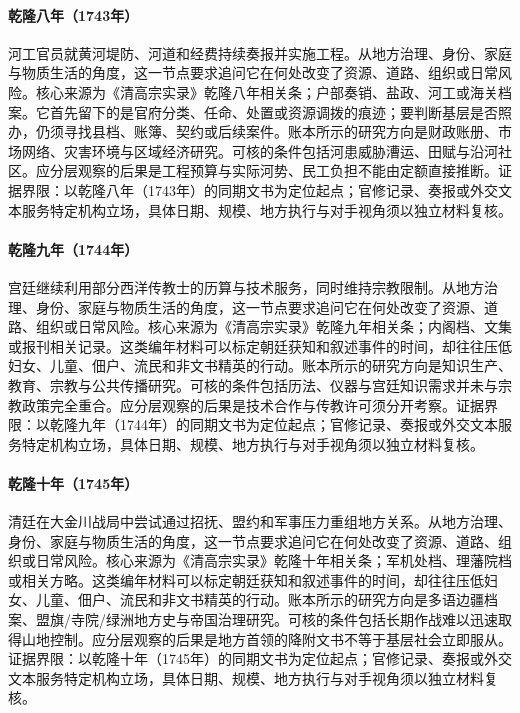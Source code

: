 \hypertarget{social:EQ-1743-YELLOW-RIVER-WORKS}{}\paragraph{乾隆八年（1743年）}河工官员就黄河堤防、河道和经费持续奏报并实施工程。从地方治理、身份、家庭与物质生活的角度，这一节点要求追问它在何处改变了资源、道路、组织或日常风险。核心来源为《清高宗实录》乾隆八年相关条；户部奏销、盐政、河工或海关档案。它首先留下的是官府分类、任命、处置或资源调拨的痕迹；要判断基层是否照办，仍须寻找县档、账簿、契约或后续案件。账本所示的研究方向是财政账册、市场网络、灾害环境与区域经济研究。可核的条件包括河患威胁漕运、田赋与沿河社区。应分层观察的后果是工程预算与实际河势、民工负担不能由定额直接推断。证据界限：以乾隆八年（1743年）的同期文书为定位起点；官修记录、奏报或外交文本服务特定机构立场，具体日期、规模、地方执行与对手视角须以独立材料复核。
\hypertarget{social:EQ-1744-JESUIT-CALENDAR-SERVICE}{}\paragraph{乾隆九年（1744年）}宫廷继续利用部分西洋传教士的历算与技术服务，同时维持宗教限制。从地方治理、身份、家庭与物质生活的角度，这一节点要求追问它在何处改变了资源、道路、组织或日常风险。核心来源为《清高宗实录》乾隆九年相关条；内阁档、文集或报刊相关记录。这类编年材料可以标定朝廷获知和叙述事件的时间，却往往压低妇女、儿童、佃户、流民和非文书精英的行动。账本所示的研究方向是知识生产、教育、宗教与公共传播研究。可核的条件包括历法、仪器与宫廷知识需求并未与宗教政策完全重合。应分层观察的后果是技术合作与传教许可须分开考察。证据界限：以乾隆九年（1744年）的同期文书为定位起点；官修记录、奏报或外交文本服务特定机构立场，具体日期、规模、地方执行与对手视角须以独立材料复核。
\hypertarget{social:EQ-1745-JINCHUAN-NEGOTIATION}{}\paragraph{乾隆十年（1745年）}清廷在大金川战局中尝试通过招抚、盟约和军事压力重组地方关系。从地方治理、身份、家庭与物质生活的角度，这一节点要求追问它在何处改变了资源、道路、组织或日常风险。核心来源为《清高宗实录》乾隆十年相关条；军机处档、理藩院档或相关方略。这类编年材料可以标定朝廷获知和叙述事件的时间，却往往压低妇女、儿童、佃户、流民和非文书精英的行动。账本所示的研究方向是多语边疆档案、盟旗/寺院/绿洲地方史与帝国治理研究。可核的条件包括长期作战难以迅速取得山地控制。应分层观察的后果是地方首领的降附文书不等于基层社会立即服从。证据界限：以乾隆十年（1745年）的同期文书为定位起点；官修记录、奏报或外交文本服务特定机构立场，具体日期、规模、地方执行与对手视角须以独立材料复核。
